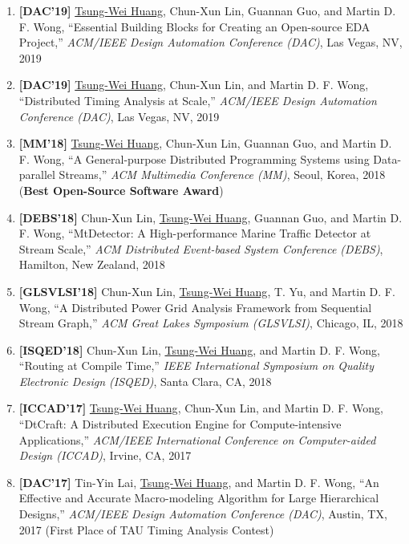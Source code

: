 \documentclass[A4,11pt]{article}
\begin{document}
\begin{enumerate}
    \item \textbf{[DAC'19]} \underline{Tsung-Wei Huang}, Chun-Xun Lin, Guannan Guo, and Martin D. F. Wong, ``Essential Building Blocks for Creating an Open-source EDA Project,'' \textit{ACM/IEEE Design Automation Conference (DAC)}, Las Vegas, NV, 2019

    \item \textbf{[DAC'19]} \underline{Tsung-Wei Huang}, Chun-Xun Lin, and Martin D. F. Wong, ``Distributed Timing Analysis at Scale,'' \textit{ACM/IEEE Design Automation Conference (DAC)}, Las Vegas, NV, 2019

    \item \textbf{[MM'18]} \underline{Tsung-Wei Huang}, Chun-Xun Lin, Guannan Guo, and Martin D. F. Wong, ``A General-purpose Distributed Programming Systems using Data-parallel Streams,'' \textit{ACM Multimedia Conference (MM)}, Seoul, Korea, 2018 (\textbf{Best Open-Source Software Award}) 

    \item \textbf{[DEBS'18]} Chun-Xun Lin, \underline{Tsung-Wei Huang}, Guannan Guo, and Martin D. F. Wong, ``MtDetector: A High-performance Marine Traffic Detector at Stream Scale,'' \textit{ACM Distributed Event-based System Conference (DEBS)}, Hamilton, New Zealand, 2018

    \item \textbf{[GLSVLSI'18]} Chun-Xun Lin, \underline{Tsung-Wei Huang}, T. Yu, and Martin D. F. Wong, ``A Distributed Power Grid Analysis Framework from Sequential Stream Graph,'' \textit{ACM Great Lakes Symposium (GLSVLSI)}, Chicago, IL, 2018

    \item \textbf{[ISQED'18]} Chun-Xun Lin, \underline{Tsung-Wei Huang}, and Martin D. F. Wong, ``Routing at Compile Time,'' \textit{IEEE International Symposium on Quality Electronic Design (ISQED)}, Santa Clara, CA, 2018

    \item \textbf{[ICCAD'17]} \underline{Tsung-Wei Huang}, Chun-Xun Lin, and Martin D. F. Wong, ``DtCraft: A Distributed Execution Engine for Compute-intensive Applications,'' \textit{ACM/IEEE International Conference on Computer-aided Design (ICCAD)}, Irvine, CA, 2017

    \item \textbf{[DAC'17]} Tin-Yin Lai, \underline{Tsung-Wei Huang}, and Martin D. F. Wong, ``An Effective and Accurate Macro-modeling Algorithm for Large Hierarchical Designs,'' \textit{ACM/IEEE Design Automation Conference (DAC)}, Austin, TX, 2017 (First Place of TAU Timing Analysis Contest)


\end{enumerate}
\end{document}
